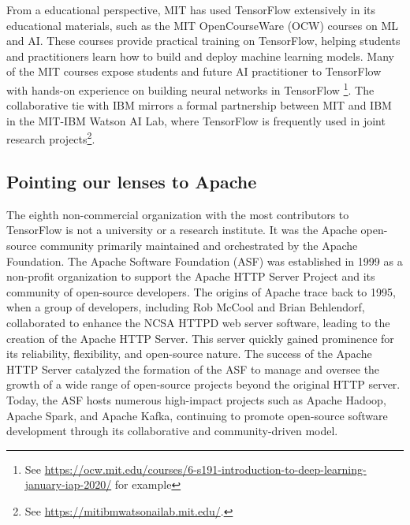 \documentclass[CHICAGO,Times1COL]{WileyNJDv5} %
\begin{document}
From a educational perspective, MIT has used TensorFlow extensively in its educational materials, such as the MIT OpenCourseWare (OCW) courses on \ac{ML} and \ac{AI}. These courses provide practical training on TensorFlow, helping students and practitioners learn how to build and deploy machine learning models.  Many of the MIT courses expose students and future \ac{AI} practitioner to TensorFlow with hands-on experience on building neural networks in TensorFlow \footnote{See \href{https://ocw.mit.edu/courses/6-s191-introduction-to-deep-learning-january-iap-2020/}{https://ocw.mit.edu/courses/6-s191-introduction-to-deep-learning-january-iap-2020/} for example}.  The collaborative tie with IBM mirrors a formal partnership  between  MIT and IBM in the MIT-IBM Watson AI Lab, where TensorFlow is frequently used in joint research projects\footnote{See \href{https://mitibmwatsonailab.mit.edu/}{https://mitibmwatsonailab.mit.edu/}.}. 












\subsection{Pointing our lenses to Apache}


The eighth non-commercial organization with the most contributors to TensorFlow is not a university or a research institute. It was the Apache open-source community primarily maintained and orchestrated by the Apache Foundation. The Apache Software Foundation (ASF) was established in 1999 as a non-profit organization to support the Apache HTTP Server Project and its community of open-source developers. The origins of Apache trace back to 1995, when a group of developers, including Rob McCool and Brian Behlendorf, collaborated to enhance the NCSA HTTPD web server software, leading to the creation of the Apache HTTP Server. This server quickly gained prominence for its reliability, flexibility, and open-source nature. The success of the Apache HTTP Server catalyzed the formation of the ASF to manage and oversee the growth of a wide range of open-source projects beyond the original HTTP server. Today, the ASF hosts numerous high-impact projects such as Apache Hadoop, Apache Spark, and Apache Kafka, continuing to promote open-source software development through its collaborative and community-driven model. 
\end{document}

